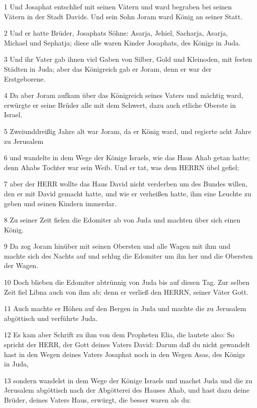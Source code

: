 \par 1 Und Josaphat entschlief mit seinen Vätern und ward begraben bei seinen Vätern in der Stadt Davids. Und sein Sohn Joram ward König an seiner Statt.
\par 2 Und er hatte Brüder, Josaphats Söhne: Asarja, Jehiel, Sacharja, Asarja, Michael und Sephatja; diese alle waren Kinder Josaphats, des Königs in Juda.
\par 3 Und ihr Vater gab ihnen viel Gaben von Silber, Gold und Kleinoden, mit festen Städten in Juda; aber das Königreich gab er Joram, denn er war der Erstgeborene.
\par 4 Da aber Joram aufkam über das Königreich seines Vaters und mächtig ward, erwürgte er seine Brüder alle mit dem Schwert, dazu auch etliche Oberste in Israel.
\par 5 Zweiunddreißig Jahre alt war Joram, da er König ward, und regierte acht Jahre zu Jerusalem
\par 6 und wandelte in dem Wege der Könige Israels, wie das Haus Ahab getan hatte; denn Ahabs Tochter war sein Weib. Und er tat, was dem HERRN übel gefiel;
\par 7 aber der HERR wollte das Haus David nicht verderben um des Bundes willen, den er mit David gemacht hatte, und wie er verheißen hatte, ihm eine Leuchte zu geben und seinen Kindern immerdar.
\par 8 Zu seiner Zeit fielen die Edomiter ab von Juda und machten über sich einen König.
\par 9 Da zog Joram hinüber mit seinen Obersten und alle Wagen mit ihm und machte sich des Nachts auf und schlug die Edomiter um ihn her und die Obersten der Wagen.
\par 10 Doch blieben die Edomiter abtrünnig von Juda bis auf diesen Tag. Zur selben Zeit fiel Libna auch von ihm ab; denn er verließ den HERRN, seiner Väter Gott.
\par 11 Auch machte er Höhen auf den Bergen in Juda und machte die zu Jerusalem abgöttisch und verführte Juda.
\par 12 Es kam aber Schrift zu ihm von dem Propheten Elia, die lautete also: So spricht der HERR, der Gott deines Vaters David: Darum daß du nicht gewandelt hast in den Wegen deines Vaters Josaphat noch in den Wegen Asas, des Königs in Juda,
\par 13 sondern wandelst in dem Wege der Könige Israels und machst Juda und die zu Jerusalem abgöttisch nach der Abgötterei des Hauses Ahab, und hast dazu deine Brüder, deines Vaters Haus, erwürgt, die besser waren als du:
